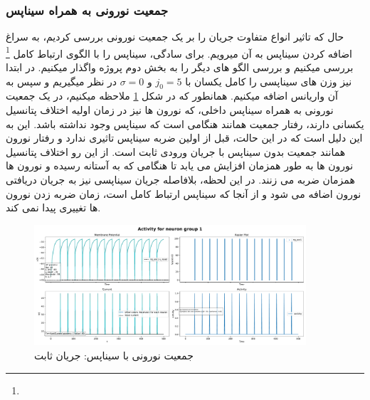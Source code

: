\documentclass{report}
\begin{document}
        \subsubsection*{جمعیت نورونی به همراه سیناپس}
        حال که تاثیر انواع متفاوت جریان را بر یک جمعیت نورونی بررسی کردیم، به سراغ اضافه کردن سیناپس به آن میرویم. برای سادگی، سیناپس را با الگوی ارتباط کامل
        \footnote{}
        بررسی میکنیم و بررسی الگو های دیگر را به بخش دوم پروژه واگذار میکنیم. در ابتدا نیز وزن های سیناپسی را کامل یکسان با
        $j_0=5$ و $\sigma=0$
        در نظر میگیریم و سپس به آن واریانس اضافه میکنیم. همانطور که در شکل
        \ref{fig:part1-simple-ng-with-synapse}
        ملاحظه میکنیم، در یک جمعیت نورونی به همراه سیناپس داخلی، که نورون ها نیز در زمان اولیه اختلاف پتانسیل یکسانی دارند، رفتار جمعیت همانند هنگامی است که سیناپس وجود نداشته باشد. این به این دلیل است که در این حالت، قبل از اولین ضربه سیناپس تاثیری ندارد و رفتار نورون  همانند جمعیت بدون سیناپس با جریان ورودی ثابت است. از این رو اختلاف پتانسیل نورون ها به طور همزمان افزایش می یابد تا هنگامی که به  آستانه رسیده و نورون ها همزمان ضربه می زنند. در این لحظه، بلافاصله جریان سیناپسی نیز به جریان دریافتی نورون اضافه می شود و از آنجا که سیناپس ارتباط کامل است، زمان ضربه زدن نورون ها تغییری پیدا نمی کند.
        \begin{figure}[!ht]
            \centering
            \includegraphics[width=0.9\textwidth]{plots/part1-Simple-ng-with-synapse.pdf} 
            \caption{جمعیت نورونی با سیناپس: جریان ثابت}
            \label{fig:part1-simple-ng-with-synapse}
        \end{figure}
\end{document}
